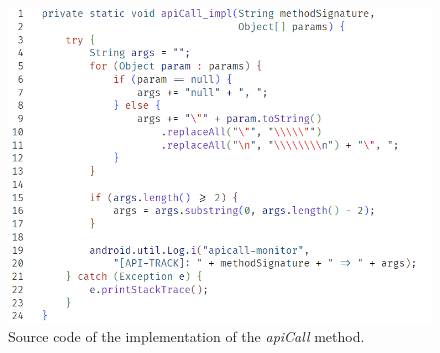 \begin{figure}
    \centering
    \includegraphics{img/api_monitor_impl.png}
    \caption{Source code of the implementation of the \textit{apiCall} method.}
    \label{lst:apitracker-monitor-impl}
\end{figure}




